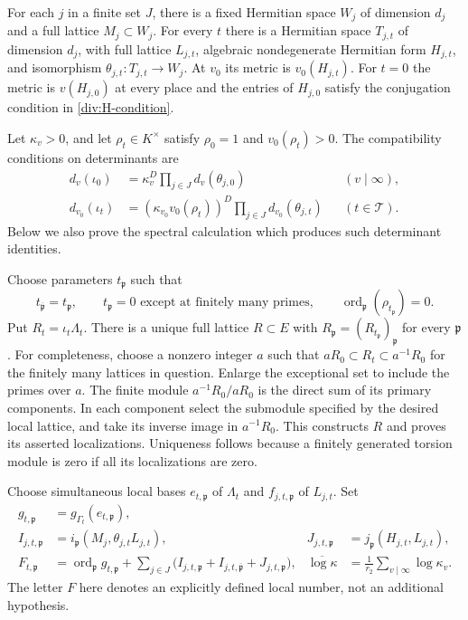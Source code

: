 For each $j$ in a finite set $J$, there is a fixed Hermitian space $W_j$
of dimension $d_j$ and a full lattice $M_j\subset W_j$. For every $t$
there is a Hermitian space $T_{j,t}$ of dimension $d_j$, with full lattice
$L_{j,t}$, algebraic nondegenerate Hermitian form $H_{j,t}$, and
isomorphism $\theta_{j,t}:T_{j,t}\to W_j$.
At $v_0$ its metric is $v_0(H_{j,t})$. For $t=0$ the metric is
$v(H_{j,0})$ at every place and the entries of $H_{j,0}$ satisfy the
conjugation condition in \eqref{div:H-condition}.

Let $\kappa_v>0$, and let $\rho_t\in K^\times$ satisfy
$\rho_0=1$ and $v_0(\rho_t)>0$. The compatibility conditions on
determinants are
\begin{align}
 d_v(\iota_0)&=\kappa_v^D\prod_{j\in J}d_v(\theta_{j,0})
                       &&(v\mid\infty),\label{div:det-base}\\
 d_{v_0}(\iota_t)&=(\kappa_{v_0}v_0(\rho_t))^D
                         \prod_{j\in J}d_{v_0}(\theta_{j,t})
                       &&(t\in\mathcal T).\label{div:det-local}
\end{align}
Below we also prove the spectral calculation which produces such
determinant identities.

Choose parameters $t_{\mathfrak p}$ such that
\begin{equation}\label{div:patch-parameters}
 t_{\overline{\mathfrak p}}=t_{\mathfrak p},\qquad
 t_{\mathfrak p}=0\text{ except at finitely many primes},\qquad
 \operatorname{ord}_{\mathfrak p}(\rho_{t_{\mathfrak p}})=0.
\end{equation}
Put $R_t=\iota_t\Lambda_t$. There is a unique full lattice $R\subset E$
with $R_{\mathfrak p}=(R_{t_{\mathfrak p}})_{\mathfrak p}$ for every
$\mathfrak p$. For completeness, choose a nonzero integer $a$ such that
$aR_0\subset R_t\subset a^{-1}R_0$ for the finitely many lattices in
question. Enlarge the exceptional set to include the primes over $a$.
The finite module $a^{-1}R_0/aR_0$ is the direct sum of its primary
components. In each component select the submodule specified by the
desired local lattice, and take its inverse image in $a^{-1}R_0$.
This constructs $R$ and proves its asserted localizations. Uniqueness
follows because a finitely generated torsion module is zero if all its
localizations are zero.

Choose simultaneous local bases $e_{t,\mathfrak p}$ of $\Lambda_t$ and
$f_{j,t,\mathfrak p}$ of $L_{j,t}$. Set
\begin{align*}
 g_{t,\mathfrak p}&=g_{\Gamma_t}(e_{t,\mathfrak p}),\\
 I_{j,t,\mathfrak p}&=i_{\mathfrak p}(M_j,\theta_{j,t}L_{j,t}),
       &J_{j,t,\mathfrak p}&=j_{\mathfrak p}(H_{j,t},L_{j,t}),\\
 F_{t,\mathfrak p}&=\operatorname{ord}_{\mathfrak p}g_{t,\mathfrak p}
       +\sum_{j\in J}\bigl(I_{j,t,\mathfrak p}
              +I_{j,t,\overline{\mathfrak p}}+J_{j,t,\mathfrak p}\bigr),
       &\overline{\log\kappa}&=\frac1{r_2}\sum_{v\mid\infty}\log\kappa_v.
\end{align*}
The letter $F$ here denotes an explicitly defined local number, not an
additional hypothesis.


